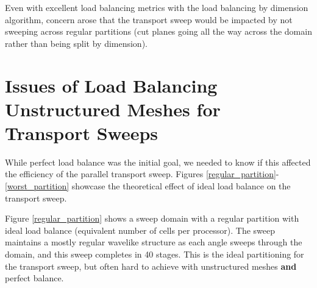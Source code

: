 \documentclass[11pt, letterpaper,titlepage,oneside]{article}
\begin{document}
Even with excellent load balancing metrics with the load balancing by dimension algorithm, concern arose that the transport sweep would be impacted by not sweeping across regular partitions (cut planes going all the way across the domain rather than being split by dimension). 

\section{Issues of Load Balancing Unstructured Meshes for Transport Sweeps}

While perfect load balance was the initial goal, we needed to know if this affected the efficiency of the parallel transport sweep. Figures \ref{regular_partition}-\ref{worst_partition} showcase the theoretical effect of ideal load balance on the transport sweep.

Figure \ref{regular_partition} shows a sweep domain with a regular partition with ideal load balance (equivalent number of cells per processor). The sweep maintains a mostly regular wavelike structure as each angle sweeps through the domain, and this sweep completes in 40 stages. This is the ideal partitioning for the transport sweep, but often hard to achieve with unstructured meshes \textbf{and} perfect balance.
\end{document}
